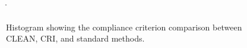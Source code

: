 \begin{figure}[H]ֿ
 \centering
    \caption
    {
Histogram showing the compliance criterion comparison between CLEAN, CRI, and standard methods.
    }
    \label{fig:hist_fig}
\end{figure}
